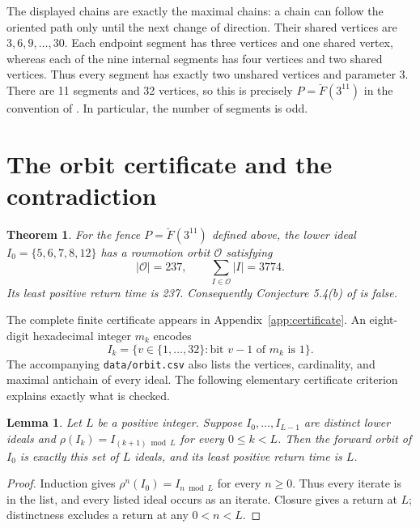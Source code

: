 \documentclass[11pt]{article}
\newtheorem{theorem}{Theorem}
\newtheorem{lemma}{Lemma}
\newcommand{\FF}{\breve F}
\begin{document}
The displayed chains are exactly the maximal chains: a chain can follow
the oriented path only until the next change of direction. Their shared
vertices are $3,6,9,\ldots,30$. Each endpoint segment has three vertices
and one shared vertex, whereas each of the nine internal segments has
four vertices and two shared vertices. Thus every segment has exactly
two unshared vertices and parameter 3. There are 11 segments and 32
vertices, so this is precisely $P=\FF(3^{11})$ in the convention of
\cite{eprs}. In particular, the number of segments is odd.

\section{The orbit certificate and the contradiction}
\begin{theorem}\label{thm:counterexample}
For the fence $P=\FF(3^{11})$ defined above, the lower ideal
$I_0=\{5,6,7,8,12\}$ has a rowmotion orbit $\mathcal O$ satisfying
\[
 |\mathcal O|=237,\qquad \sum_{I\in\mathcal O}|I|=3774.
\]
Its least positive return time is 237. Consequently Conjecture 5.4(b)
of \cite{eprs} is false.
\end{theorem}

The complete finite certificate appears in Appendix~\ref{app:certificate}.
An eight-digit hexadecimal integer $m_k$ encodes
\[
 I_k=\{v\in\{1,\ldots,32\}:\text{bit }v-1\text{ of }m_k\text{ is }1\}.
\]
The accompanying \texttt{data/orbit.csv} also lists the vertices,
cardinality, and maximal antichain of every ideal. The following
elementary certificate criterion explains exactly what is checked.

\begin{lemma}\label{lem:certificate}
Let $L$ be a positive integer. Suppose $I_0,\ldots,I_{L-1}$ are distinct lower ideals and
$\rho(I_k)=I_{(k+1)\bmod L}$ for every $0\le k<L$.
Then the forward orbit of $I_0$ is exactly this set of $L$ ideals,
and its least positive return time is $L$.
\end{lemma}
\begin{proof}
Induction gives $\rho^n(I_0)=I_{n\bmod L}$ for every $n\ge0$.
Thus every iterate is in the list, and every listed ideal occurs as an
iterate. Closure gives a return at $L$; distinctness excludes a return
at any $0<n<L$.
\end{proof}
\end{document}
